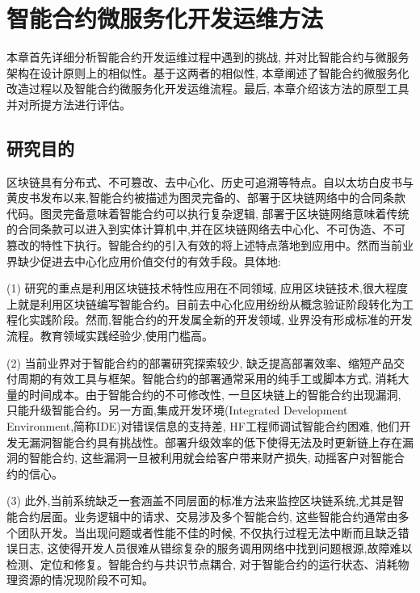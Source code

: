 \chapter{智能合约微服务化开发运维方法}

本章首先详细分析智能合约开发运维过程中遇到的挑战, 并对比智能合约与微服务架构在设计原则上的相似性。基于这两者的相似性, 本章阐述了智能合约微服务化改造过程以及智能合约微服务化开发运维流程。最后, 本章介绍该方法的原型工具并对所提方法进行评估。

\section{研究目的}

区块链具有分布式、不可篡改、去中心化、历史可追溯等特点。自以太坊白皮书与黄皮书发布以来,智能合约被描述为图灵完备的、部署于区块链网络中的合同条款代码。图灵完备意味着智能合约可以执行复杂逻辑, 部署于区块链网络意味着传统的合同条款可以进入到实体计算机中,并在区块链网络去中心化、不可伪造、不可篡改的特性下执行。智能合约的引入有效的将上述特点落地到应用中。然而当前业界缺少促进去中心化应用价值交付的有效手段。具体地:

(1) 研究的重点是利用区块链技术特性应用在不同领域\cite{leka2019systematic}, 应用区块链技术,很大程度上就是利用区块链编写智能合约\cite{sun2018technology}。目前去中心化应用纷纷从概念验证阶段转化为工程化实践阶段。然而,智能合约的开发属全新的开发领域, 业界没有形成标准的开发流程。教育领域实践经验少\cite{yang2017application},使用门槛高。

(2) 当前业界对于智能合约的部署研究探索较少, 缺乏提高部署效率、缩短产品交付周期的有效工具与框架\cite{rodler2018sereum}。智能合约的部署通常采用的纯手工或脚本方式\cite{tiansong2019design}\cite{bumblauskas2020blockchain}, 消耗大量的时间成本。由于智能合约的不可修改性, 一旦区块链上的智能合约出现漏洞, 只能升级智能合约。另一方面,集成开发环境(Integrated Development Environment,简称IDE)对错误信息的支持差, HF工程师调试智能合约困难, 他们开发无漏洞智能合约具有挑战性。部署升级效率的低下使得无法及时更新链上存在漏洞的智能合约, 这些漏洞一旦被利用就会给客户带来财产损失, 动摇客户对智能合约的信心\cite{han2019security}。

(3) 此外,当前系统缺乏一套涵盖不同层面的标准方法来监控区块链系统\cite{li2020exploring},尤其是智能合约层面。业务逻辑中的请求、交易涉及多个智能合约, 这些智能合约通常由多个团队开发。当出现问题或者性能不佳的时候, 不仅执行过程无法中断而且缺乏错误日志, 这使得开发人员很难从错综复杂的服务调用网络中找到问题根源,故障难以检测、定位和修复。智能合约与共识节点耦合, 对于智能合约的运行状态、消耗物理资源的情况现阶段不可知。

